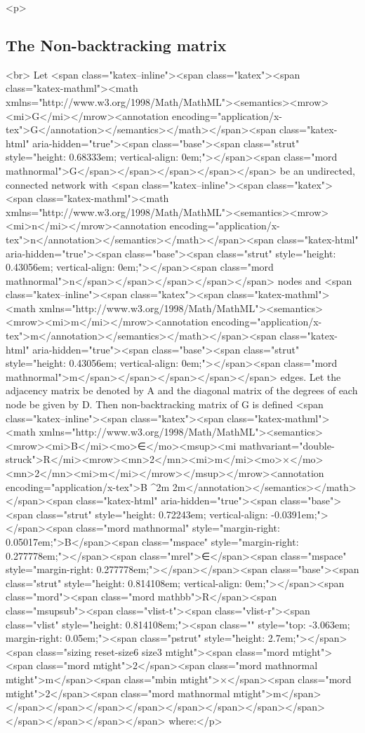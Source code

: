 <p>\subsection{The Non-backtracking matrix}<br>
Let <span class="katex--inline"><span class="katex"><span class="katex-mathml"><math xmlns="http://www.w3.org/1998/Math/MathML"><semantics><mrow><mi>G</mi></mrow><annotation encoding="application/x-tex">G</annotation></semantics></math></span><span class="katex-html" aria-hidden="true"><span class="base"><span class="strut" style="height: 0.68333em; vertical-align: 0em;"></span><span class="mord mathnormal">G</span></span></span></span></span> be an undirected, connected network with <span class="katex--inline"><span class="katex"><span class="katex-mathml"><math xmlns="http://www.w3.org/1998/Math/MathML"><semantics><mrow><mi>n</mi></mrow><annotation encoding="application/x-tex">n</annotation></semantics></math></span><span class="katex-html" aria-hidden="true"><span class="base"><span class="strut" style="height: 0.43056em; vertical-align: 0em;"></span><span class="mord mathnormal">n</span></span></span></span></span> nodes and <span class="katex--inline"><span class="katex"><span class="katex-mathml"><math xmlns="http://www.w3.org/1998/Math/MathML"><semantics><mrow><mi>m</mi></mrow><annotation encoding="application/x-tex">m</annotation></semantics></math></span><span class="katex-html" aria-hidden="true"><span class="base"><span class="strut" style="height: 0.43056em; vertical-align: 0em;"></span><span class="mord mathnormal">m</span></span></span></span></span> edges. Let the adjacency matrix be denoted by A and the diagonal matrix of the degrees of each node be given by D. Then non-backtracking matrix of G is defined <span class="katex--inline"><span class="katex"><span class="katex-mathml"><math xmlns="http://www.w3.org/1998/Math/MathML"><semantics><mrow><mi>B</mi><mo>∈</mo><msup><mi mathvariant="double-struck">R</mi><mrow><mn>2</mn><mi>m</mi><mo>×</mo><mn>2</mn><mi>m</mi></mrow></msup></mrow><annotation encoding="application/x-tex">B \in {}^{2m \times 2m}</annotation></semantics></math></span><span class="katex-html" aria-hidden="true"><span class="base"><span class="strut" style="height: 0.72243em; vertical-align: -0.0391em;"></span><span class="mord mathnormal" style="margin-right: 0.05017em;">B</span><span class="mspace" style="margin-right: 0.277778em;"></span><span class="mrel">∈</span><span class="mspace" style="margin-right: 0.277778em;"></span></span><span class="base"><span class="strut" style="height: 0.814108em; vertical-align: 0em;"></span><span class="mord"><span class="mord mathbb">R</span><span class="msupsub"><span class="vlist-t"><span class="vlist-r"><span class="vlist" style="height: 0.814108em;"><span class="" style="top: -3.063em; margin-right: 0.05em;"><span class="pstrut" style="height: 2.7em;"></span><span class="sizing reset-size6 size3 mtight"><span class="mord mtight"><span class="mord mtight">2</span><span class="mord mathnormal mtight">m</span><span class="mbin mtight">×</span><span class="mord mtight">2</span><span class="mord mathnormal mtight">m</span></span></span></span></span></span></span></span></span></span></span></span></span> where:</p>
